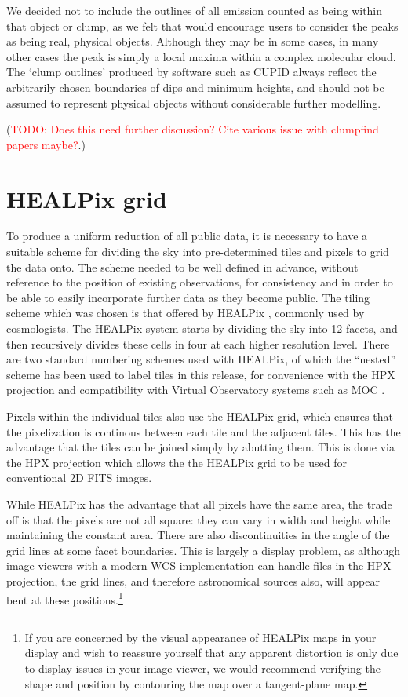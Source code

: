 \documentclass[twocolumn,times]{aastex6}
\newcommand{\todo}[1]{\textcolor{red}{TODO: #1}}
\begin{document}
We decided not to include the outlines of all emission counted as
being within that object or clump, as we felt that would encourage
users to consider the peaks as being real, physical objects. Although
they may be in some cases, in many other cases the peak is simply a
local maxima within a complex molecular cloud. The `clump outlines'
produced by software such as CUPID always reflect the arbitrarily
chosen boundaries of dips and minimum heights, and should not be
assumed to represent physical objects without considerable further
modelling.

(\todo{Does this need further discussion? Cite various issue with clumpfind papers maybe?}.)


\section{HEALPix grid}
\label{sec:healpix}

To produce a uniform reduction of all public data, it is necessary to
have a suitable scheme for dividing the sky into pre-determined tiles
and pixels to grid the data onto.  The scheme needed to be well
defined in advance, without reference to the position of existing
observations, for consistency and in order to be able to easily
incorporate further data as they become public.  The tiling scheme
which was chosen is that offered by HEALPix \citep[Hierarchical Equal
Area isoLatitude Pixelization,][]{Gorski2005}, commonly used by
cosmologists. The HEALPix system starts by dividing the sky into 12
facets, and then recursively divides these cells in four at each
higher resolution level.  There are two standard numbering schemes
used with HEALPix, of which the ``nested'' scheme has been used to
label tiles in this release, for convenience with the HPX projection
and compatibility with Virtual Observatory systems such as MOC
\citep[Multi-Order Coverage,][]{2013ASPC..475..135F}.

Pixels within the individual tiles also use the HEALPix grid, which
ensures that the pixelization is continous between each tile and the
adjacent tiles.  This has the advantage that the tiles can be joined
simply by abutting them.  This is done via the HPX projection
\citep{Calabretta2007} which allows the the HEALPix grid to be used
for conventional 2D FITS images.

While HEALPix has the advantage that all pixels have the same area,
the trade off is that the pixels are not all square: they can vary in
width and height while maintaining the constant area.  There are also
discontinuities in the angle of the grid lines at some facet
boundaries.  This is largely a display problem, as although image
viewers with a modern WCS implementation can handle files in the HPX
projection, the grid lines, and therefore astronomical sources also,
will appear bent at these positions.\footnote{If you are concerned by
  the visual appearance of HEALPix maps in your display and wish to
  reassure yourself that any apparent distortion is only due to
  display issues in your image viewer, we would recommend verifying
  the shape and position by contouring the map over a tangent-plane
  map.}
\end{document}
